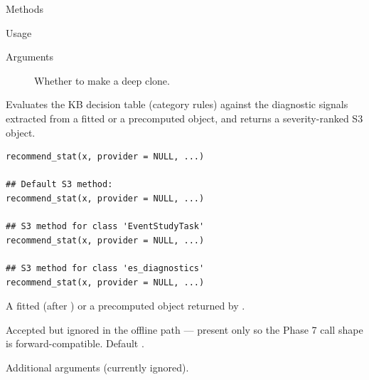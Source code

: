 \documentclass[a4paper]{book}
\begin{document}
\begin{Section}{Methods}
\begin{SubSection}{}
\begin{SubSubSection}{Usage}
\end{SubSubSection}

%
\begin{SubSubSection}{Arguments}

\begin{description}

\item[] Whether to make a deep clone.

\end{description}



\end{SubSubSection}

\end{SubSection}


\end{Section}
%
\begin{Description}
Evaluates the KB decision table (category  rules) against
the diagnostic signals extracted from a fitted  or a
precomputed  object, and returns a severity-ranked
 S3 object.
\end{Description}
%
\begin{Usage}
\begin{verbatim}
recommend_stat(x, provider = NULL, ...)

## Default S3 method:
recommend_stat(x, provider = NULL, ...)

## S3 method for class 'EventStudyTask'
recommend_stat(x, provider = NULL, ...)

## S3 method for class 'es_diagnostics'
recommend_stat(x, provider = NULL, ...)
\end{verbatim}
\end{Usage}
%
\begin{Arguments}
\begin{ldescription}
\item[\code{x}] A fitted  (after ) or a
precomputed  object returned by .

\item[\code{provider}] Accepted but ignored in the offline path — present only so
the Phase 7 call shape is forward-compatible. Default .

\item[\code{...}] Additional arguments (currently ignored).
\end{ldescription}
\end{Arguments}
\end{document}
